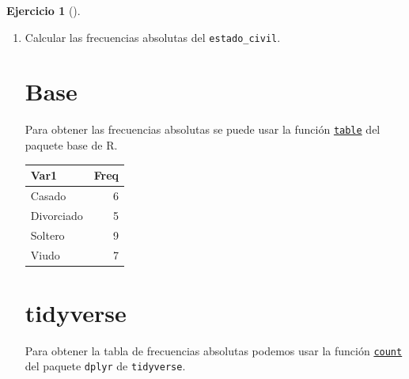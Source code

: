 \documentclass[
  spanish,
  a4paper,
]{scrreport}
\newenvironment{Shaded}{\begin{snugshade}}{\end{snugshade}}
\newcommand{\FunctionTok}[1]{\textcolor[rgb]{0.28,0.35,0.67}{#1}}
\newcommand{\NormalTok}[1]{\textcolor[rgb]{0.00,0.23,0.31}{#1}}
\newcommand{\SpecialCharTok}[1]{\textcolor[rgb]{0.37,0.37,0.37}{#1}}
\theoremstyle{definition}
\newtheorem{exercise}{Ejercicio}[chapter]
\theoremstyle{remark}
\begin{document}
\begin{exercise}[]
\begin{enumerate}
\begin{tcolorbox}
  \end{tcolorbox}
\item
  Calcular las frecuencias absolutas del \texttt{estado\_civil}.

  \begin{tcolorbox}[enhanced jigsaw, breakable, leftrule=.75mm, toptitle=1mm, rightrule=.15mm, opacitybacktitle=0.6, left=2mm, colframe=quarto-callout-tip-color-frame, titlerule=0mm, toprule=.15mm, opacityback=0, bottomtitle=1mm, coltitle=black, colbacktitle=quarto-callout-tip-color!10!white, title=\textcolor{quarto-callout-tip-color}{\faLightbulb}\hspace{0.5em}{Solución}, arc=.35mm, bottomrule=.15mm, colback=white]

  \section{Base}

  Para obtener las frecuencias absolutas se puede usar la función
  \href{https://www.rdocumentation.org/packages/base/versions/3.6.2/topics/table}{\texttt{table}}
  del paquete base de R.

\begin{Shaded}
\end{Shaded}

  \begin{longtable}[]{@{}lr@{}}
  \toprule\noalign{}
  Var1 & Freq \\
  \midrule\noalign{}
  \endhead
  \bottomrule\noalign{}
  \endlastfoot
  Casado & 6 \\
  Divorciado & 5 \\
  Soltero & 9 \\
  Viudo & 7 \\
  \end{longtable}

  \section{tidyverse}

  Para obtener la tabla de frecuencias absolutas podemos usar la función
  \href{https://aprendeconalf.es/manual-r/06-preprocesamiento.html\#conteo-del-n\%C3\%BAmero-de-observaciones}{\texttt{count}}
  del paquete \texttt{dplyr} de \texttt{tidyverse}.


\end{tcolorbox}
\end{enumerate}
\end{exercise}
\end{document}
